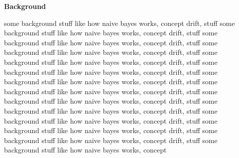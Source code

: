 \begin{center} \textbf{\huge Background} \end{center}

some background stuff like how naive bayes works, concept drift, stuff some background stuff like how naive bayes works, concept drift, stuff some background stuff like how naive bayes works, concept drift, stuff some background stuff like how naive bayes works, concept drift, stuff some background stuff like how naive bayes works, concept drift, stuff some background stuff like how naive bayes works, concept drift, stuff some background stuff like how naive bayes works, concept drift, stuff some background stuff like how naive bayes works, concept drift, stuff some background stuff like how naive bayes works, concept drift, stuff some background stuff like how naive bayes works, concept drift, stuff some background stuff like how naive bayes works, concept drift, stuff some background stuff like how naive bayes works, concept drift, stuff some background stuff like how naive bayes works, concept drift, stuff some background stuff like how naive bayes works, concept 
